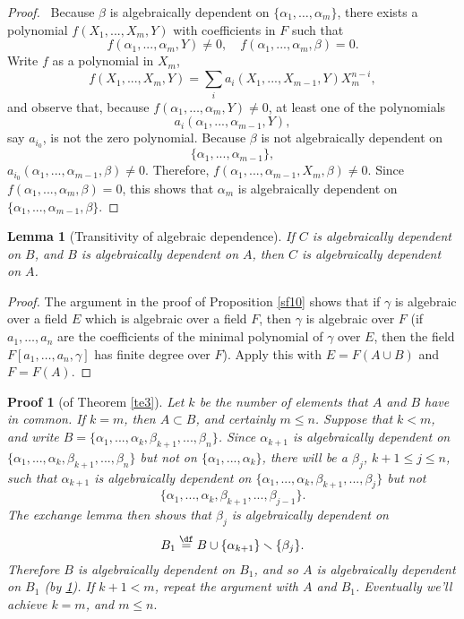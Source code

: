 \documentclass[a4paper,11pt,final,openany]{memoir}
\newtheorem{lemma}[X]{Lemma}
\theoremstyle{nonumberplain}
\newtheorem{proof}{Proof.}
\newtheorem{pf}{Proof}
\begin{document}
\begin{proof}
\ Because $\beta$ is algebraically dependent on $\{\alpha_{1},\ldots
,\alpha_{m}\}$, there exists a polynomial $f(X_{1},...,X_{m},Y)$ with
coefficients in $F$ such that
\[
f(\alpha_{1},...,\alpha_{m},Y)\neq0,\quad f(\alpha_{1},...,\alpha_{m}%
,\beta)=0.
\]
Write $f$ as a polynomial in $X_{m}$,
\[
f(X_{1},...,X_{m},Y)=\sum_{i}a_{i}(X_{1},...,X_{m-1},Y)X_{m}^{n-i},
\]
and observe that, because $f(\alpha_{1},\ldots,\alpha_{m},Y)\neq0$, at least
one of the polynomials
\[
a_{i}(\alpha_{1},...,\alpha_{m-1},Y),
\]
say $a_{i_{0}}$, is not the zero polynomial. Because $\beta$ is not
algebraically dependent on
\[
\{\alpha_{1},...,\alpha_{m-1}\},
\]
$a_{i_{0}}(\alpha_{1},...,\alpha_{m-1},\beta)\neq0$. Therefore, $f(\alpha
_{1},...,\alpha_{m-1},X_{m},\beta)\neq0$. Since $f(\alpha_{1},...,\alpha
_{m},\beta)=0$, this shows that $\alpha_{m}$ is algebraically dependent on
$\{\alpha_{1},...,\alpha_{m-1},\beta\}$.
\end{proof}

\begin{lemma}
[Transitivity of algebraic dependence]\label{te5} If $C$ is algebraically
dependent on $B$, and $B$ is algebraically dependent on $A$, then $C$ is
algebraically dependent on $A$.
\end{lemma}

\begin{proof}
The argument in the proof of Proposition \ref{sf10} shows that if $\gamma$ is
algebraic over a field $E$ which is algebraic over a field $F$, then $\gamma$
is algebraic over $F$ (if $a_{1},\ldots,a_{n}$ are the coefficients of the
minimal polynomial of $\gamma$ over $E$, then the field $F[a_{1},\ldots
,a_{n},\gamma]$ has finite degree over $F$). Apply this with $E=F(A\cup B)$
and $F=F(A)$.
\end{proof}

\begin{pf}
[of Theorem \ref{te3}]Let $k$ be the number of elements that $A$ and $B$ have
in common. If $k=m$, then $A\subset B$, and certainly $m\leq n$. Suppose that
$k<{}m$, and write $B=\{\alpha_{1},...,\alpha_{k},\beta_{k+1},...,\beta_{n}%
\}$. Since $\alpha_{k+1}$ is algebraically dependent on $\{\alpha
_{1},...,\alpha_{k},\beta_{k+1},...,\beta_{n}\}$ but not on $\{\alpha
_{1},...,\alpha_{k}\}$, there will be a $\beta_{j}$, $k+1\leq j\leq n$, such
that $\alpha_{k+1}$ is algebraically dependent on $\{\alpha_{1},...,\alpha
_{k},\beta_{k+1},...,\beta_{j}\}$ but not
\[
\{\alpha_{1},...,\alpha_{k},\beta_{k+1},...,\beta_{j-1}\}.
\]
The exchange lemma then shows that $\beta_{j}$ is algebraically dependent on
\[
B_{1}\overset{\df}{=}B\cup\{\alpha_{k+1}\}\smallsetminus
\{\beta_{j}\}.
\]
Therefore $B$ is algebraically dependent on $B_{1}$, and so $A$ is
algebraically dependent on $B_{1}$ (by \ref{te5}). If $k+1<m$, repeat the
argument with $A$ and $B_{1}$. Eventually we'll achieve $k=m$, and $m\leq n.$
\end{pf}
\end{document}
